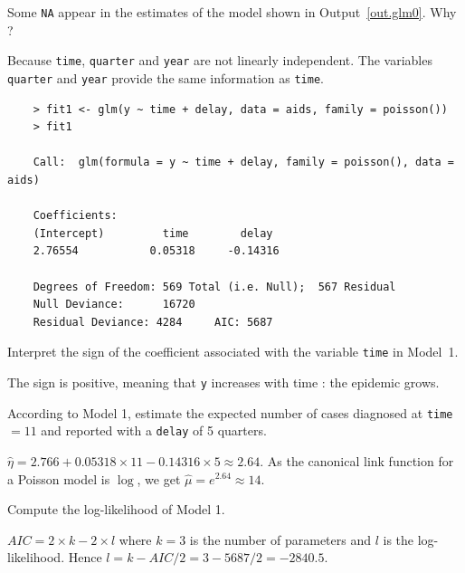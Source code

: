 \documentclass[11pt,a4paper%
addpoints, 
]{exam}
\begin{document}
\begin{questions}
\question[2] Some \texttt{NA} appear in the estimates of the model shown in Output~\ref{out.glm0}. Why ?
\begin{solution}
	Because \texttt{time}, \texttt{quarter} and \texttt{year} are not linearly independent. The variables \texttt{quarter} and \texttt{year} provide the same information as \texttt{time}.
\end{solution}


\begin{center}
	\begin{verbatim}
	> fit1 <- glm(y ~ time + delay, data = aids, family = poisson())
	> fit1
	
	Call:  glm(formula = y ~ time + delay, family = poisson(), data = aids)
	
	Coefficients:
	(Intercept)         time        delay  
	2.76554           0.05318     -0.14316  
	
	Degrees of Freedom: 569 Total (i.e. Null);  567 Residual
	Null Deviance:	    16720 
	Residual Deviance: 4284 	AIC: 5687
	\end{verbatim}
\end{center}

\question[2] Interpret the sign of the coefficient associated with the variable \texttt{time} in Model~1. 
\begin{solution}
	The sign is positive, meaning that  \texttt{y} increases with time : the epidemic grows.
\end{solution}

\question[2] According to Model 1, estimate the expected number of cases diagnosed at \texttt{time} $ = 11$ and reported with a \texttt{delay} of 5 quarters.
\begin{solution}
	$\hat{\eta} = 2.766 + 0.05318 \times 11 -0.14316 \times 5 \approx 2.64$.
	As the canonical link function for a Poisson model is $\log$, we get $\hat{\mu} = e^{2.64} \approx 14$.
\end{solution}

\question[2] Compute the log-likelihood of Model 1.
\begin{solution}
	$AIC = 2 \times k - 2\times l$ where $k = 3$ is the number of parameters and $l$ is the log-likelihood. Hence $l = k - AIC / 2 = 3 - 5687 / 2 = -2840.5$.
\end{solution}



\end{questions}
\end{document}
